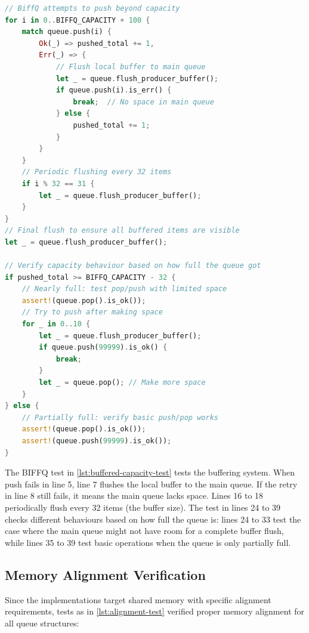 \begin{lstlisting}[language=Rust, style=boxed, caption={Buffered queue capacity test}, label={lst:buffered-capacity-test}]
// BiffQ attempts to push beyond capacity
for i in 0..BIFFQ_CAPACITY + 100 {
    match queue.push(i) {
        Ok(_) => pushed_total += 1,
        Err(_) => {
            // Flush local buffer to main queue
            let _ = queue.flush_producer_buffer();
            if queue.push(i).is_err() {
                break;  // No space in main queue
            } else {
                pushed_total += 1;
            }
        }
    }
    // Periodic flushing every 32 items
    if i % 32 == 31 {
        let _ = queue.flush_producer_buffer();
    }
}
// Final flush to ensure all buffered items are visible
let _ = queue.flush_producer_buffer();

// Verify capacity behaviour based on how full the queue got
if pushed_total >= BIFFQ_CAPACITY - 32 {
    // Nearly full: test pop/push with limited space
    assert!(queue.pop().is_ok());
    // Try to push after making space
    for _ in 0..10 {
        let _ = queue.flush_producer_buffer();
        if queue.push(99999).is_ok() {
            break;
        }
        let _ = queue.pop(); // Make more space
    }
} else {
    // Partially full: verify basic push/pop works
    assert!(queue.pop().is_ok());
    assert!(queue.push(99999).is_ok());
}
\end{lstlisting}

The \ac{BIFFQ} test in \cref{lst:buffered-capacity-test} tests the buffering system. When push fails in line 5, line 7 flushes the local buffer to the main queue. If the retry in line 8 still fails, it means the main queue lacks space. Lines 16 to 18 periodically flush every 32 items (the buffer size). The test in lines 24 to 39 checks different behaviours based on how full the queue is: lines 24 to 33 test the case where the main queue might not have room for a complete buffer flush, while lines 35 to 39 test basic operations when the queue is only partially full.

\subsection{Memory Alignment Verification}
Since the implementations target shared memory with specific alignment requirements, tests as in \cref{lst:alignment-test} verified proper memory alignment for all queue structures:

